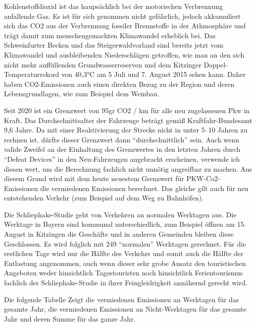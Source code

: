 \documentclass[fontsize=12pt,a4paper]{scrreprt}
\begin{document}
Kohlenstoffdioxid ist das haupsächlich bei der motorischen Verbrennung anfallende Gas. Es ist für sich genommen nicht gefährlich, jedoch akkumuliert sich das CO2 aus der Verbrennung fossiler Brennstoffe in der Athmosphäre und trägt damit zum menschengemachten Klimawandel erheblich bei.
Das Schweinfurter Becken und das Steigerwaldvorland sind bereits jetzt vom Klimawandel und ausbleibenden Niederschlägen getroffen, wie man an den sich nicht mehr auffüllenden Grundwasserreserven und dem Kitzinger Doppel-Temperaturrekord von 40,3°C am 5 Juli und 7. August 2015 sehen kann.
Daher haben CO2-Emissionen auch einen direkten Bezug zu der Region und deren Lebensgrundlagen, wie zum Beispiel dem Weinbau.

\vspace{1em}

Seit 2020 ist ein Grenzwert von 95gr CO2 / km für alle neu zugelassenen Pkw in Kraft. Das Durchschnittsalter der Fahrzeuge beträgt gemäß Kraftfahr-Bundesamt 9,6 Jahre. Da mit einer Reaktivierung der Strecke nicht in unter 5--10 Jahren zu rechnen ist, dürfte dieser Grenzwert dann \enquote{durchschnittlich} sein. Auch wenn valide Zweifel an der Einhaltung des Grenzwertes in den letzten Jahren durch \enquote{Defeat Devices} in den Neu-Fahrzeugen angebracht erscheinen, verwende ich diesen wert, um die Berechnung fachlich nicht unnötig angreifbar zu machen.
Aus diesem Grund wird mit dem heute neuestem Grenzwert für PKW-Co2-Emissionen die vermiedenen Emissionen berechnet. Das gleiche gilt auch für neu entstehenden Verkehr (zum Beispiel auf dem Weg zu Bahnhöfen).

\vspace{1em}

Die Schliephake-Studie geht von Verkehren an normalen Werktagen aus. Die Werktage in Bayern sind kommunal unterschiedlich, zum Beispiel öffnen am 15. August in Kitzingen die Geschäfte und in anderen Gemeinden bleiben diese Geschlossen. Es wird folglich mit 249 \enquote{normalen} Werktagen gerechnet. Für die restlichen Tage wird nur die Hälfte des Verkehrs und somit auch die Hälfte der Entlastung angenommen, auch wenn dieser sehr grobe Ansatz den touristischen Angeboten weder hinsichtlich Tagestouristen noch hinsichtlich Ferientourismus fachlich der Schliephake-Studie in ihrer Feingleidrigkeit annähernd gerecht wird.

\vspace{1em}

Die folgende Tabelle Zeigt die vermiedenen Emissionen an Werktagen für das gesamte Jahr, die vermiedenen Emissionen an Nicht-Werktagen für das gesamte Jahr und deren Summe für das ganze Jahr.
\end{document}
